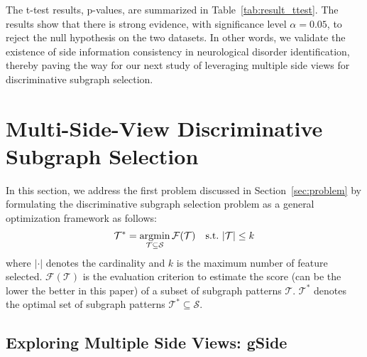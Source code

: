 \documentclass[conference]{IEEEtran}
\newcommand{\gscore}[0]{gSide}
\begin{document}
The t-test results, p-values, are summarized in Table~\ref{tab:result_ttest}. The results show that there is strong evidence, with significance level $\alpha=0.05$, to reject the null hypothesis on the two datasets. In other words, we validate the existence of side information consistency in neurological disorder identification, thereby paving the way for our next study of leveraging multiple side views for discriminative subgraph selection.

\section{Multi-Side-View Discriminative \\Subgraph Selection}\label{sec:method}

In this section, we address the first problem discussed in Section~\ref{sec:problem} by formulating the discriminative subgraph selection problem as a general optimization framework as follows:
\begin{equation}
\mathcal{T}^*=\operatornamewithlimits{argmin}_{\mathcal{T}\subseteq\mathcal{S}}\mathcal{F}(\mathcal{T})~~~\text{s.t.}~|\mathcal{T}|\le k
\label{eq:argmin1}
\end{equation}
where $|\cdot|$ denotes the cardinality and $k$ is the maximum number of feature selected. $\mathcal{F}(\mathcal{T})$ is the evaluation criterion to estimate the score (can be the lower the better in this paper) of a subset of subgraph patterns $\mathcal{T}$. $\mathcal{T}^*$ denotes the optimal set of subgraph patterns $\mathcal{T}^*\subseteq\mathcal{S}$.

\subsection{Exploring Multiple Side Views: \gscore}
\end{document}
